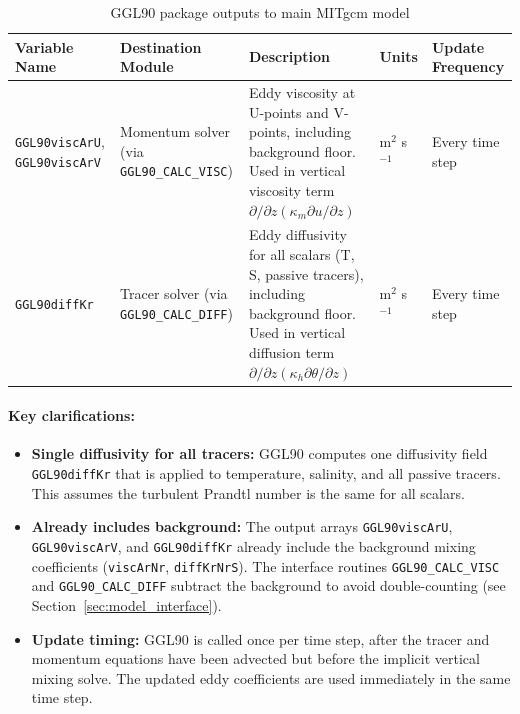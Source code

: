 \documentclass[12pt,letterpaper]{article}
\begin{document}
\begin{table}[ht]
\centering
\caption{GGL90 package outputs to main MITgcm model}
\label{tab:package_outputs}
\small
\begin{tabular}{p{3cm}p{3.5cm}p{5cm}lp{2.5cm}}
\toprule
\textbf{Variable Name} & \textbf{Destination Module} & \textbf{Description} & \textbf{Units} & \textbf{Update Frequency} \\
\midrule
\verb|GGL90viscArU|, \verb|GGL90viscArV| & Momentum solver (via \verb|GGL90_CALC_VISC|) & Eddy viscosity at U-points and V-points, including background floor. Used in vertical viscosity term $\partial/\partial z(\kappa_m \partial u/\partial z)$ & m$^2$ s$^{-1}$ & Every time step \\
\addlinespace
\verb|GGL90diffKr| & Tracer solver (via \verb|GGL90_CALC_DIFF|) & Eddy diffusivity for all scalars (T, S, passive tracers), including background floor. Used in vertical diffusion term $\partial/\partial z(\kappa_h \partial \theta/\partial z)$ & m$^2$ s$^{-1}$ & Every time step \\
\bottomrule
\end{tabular}
\end{table}

\paragraph{Key clarifications:}
\begin{itemize}
\item \textbf{Single diffusivity for all tracers:} GGL90 computes one diffusivity field \verb|GGL90diffKr| that is applied to temperature, salinity, and all passive tracers. This assumes the turbulent Prandtl number is the same for all scalars.

\item \textbf{Already includes background:} The output arrays \verb|GGL90viscArU|, \verb|GGL90viscArV|, and \verb|GGL90diffKr| already include the background mixing coefficients (\verb|viscArNr|, \verb|diffKrNrS|). The interface routines \verb|GGL90_CALC_VISC| and \verb|GGL90_CALC_DIFF| subtract the background to avoid double-counting (see Section~\ref{sec:model_interface}).

\item \textbf{Update timing:} GGL90 is called once per time step, after the tracer and momentum equations have been advected but before the implicit vertical mixing solve. The updated eddy coefficients are used immediately in the same time step.
\end{itemize}
\end{document}
